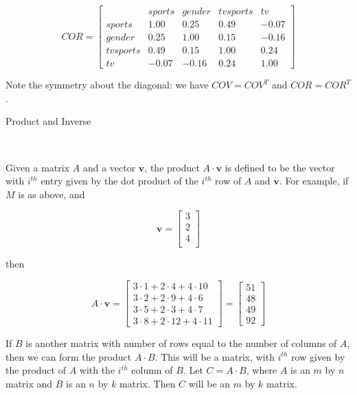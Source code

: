 \documentclass{article}
\begin{document}
\[ COR = \left[ \begin{array}{ccccc}
 & sports & gender & tv sports & tv \\
sports & 1.00 &  0.25 & 0.49 & -0.07 \\
gender & 0.25 & 1.00 & 0.15 & -0.16  \\
tv sports  & 0.49 & 0.15 & 1.00 & 0.24 \\
tv  & -0.07 & -0.16 & 0.24 & 1.00 
\end{array} \right]\] 


Note the symmetry about the diagonal: we have $COV = COV^T$ and $COR = COR^T$.\\

\centerline{\sc \large Product and Inverse}\


Given a matrix $A$ and a vector $\textbf{v}$, the product $A \cdot \textbf{v}$ is defined to be the vector with $i^{th}$ entry given by the dot product of the $i^{th}$ row of $A$ and $\textbf{v}$. For example, if $M$ is as above, and 

\[ \textbf{v} = \left[ \begin{array}{c}
3 \\
2  \\
4 \\
\end{array} \right]\] 

then

\[ A  \cdot \textbf{v} = \left[ \begin{array}{c}
3 \cdot 1 + 2 \cdot4 + 4 \cdot 10 \\
3 \cdot 2 + 2 \cdot 9 + 4 \cdot 6 \\
3 \cdot 5 + 2 \cdot 3 + 4 \cdot 7  \\
3 \cdot 8 + 2 \cdot 12 + 4 \cdot 11 \end{array} \right] = \left[ \begin{array}{c}
51 \\
48 \\
49  \\
92 \end{array} \right]  \]  

If $B$ is another matrix with number of rows equal to the number of columns of $A$, then we can form the product $A \cdot B$. This will be a matrix, with $i^{th}$ row given by the  product of $A$ with the $i^{th}$ column of $B$. Let $C = A \cdot B$, where $A$ is an $m$ by $n$ matrix and $B$ is an $n$ by $k$ matrix. Then $C$ will be an $m$ by $k$ matrix.\\
\end{document}
